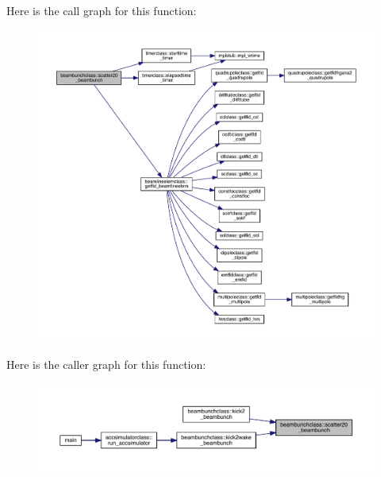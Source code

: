 Here is the call graph for this function\+:\nopagebreak
\begin{figure}[H]
\begin{center}
\leavevmode
\includegraphics[width=350pt]{namespacebeambunchclass_a8a96c99996275cf03ceec41dc011695e_cgraph}
\end{center}
\end{figure}
Here is the caller graph for this function\+:\nopagebreak
\begin{figure}[H]
\begin{center}
\leavevmode
\includegraphics[width=350pt]{namespacebeambunchclass_a8a96c99996275cf03ceec41dc011695e_icgraph}
\end{center}
\end{figure}
\mbox{\label{namespacebeambunchclass_add3fe05fd157f9a0d3f09445660f038e}} 

